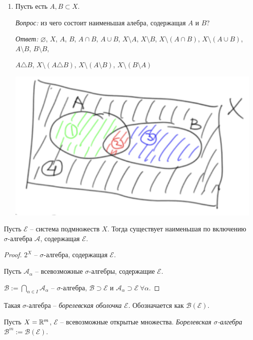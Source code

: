 \begin{example}
\begin{enumerate}
        \item Пусть есть $A, B\subset X$. 
        
        \textit{Вопрос:} из чего состоит наименьшая алебра, содержащая $A$ и $B$?
        
        \textit{Ответ:} $\varnothing$, $X$, $A$, $B$, $A\cap B$, $A \cup B$, $X \setminus A$, $X \setminus B$, $X \setminus (A\cap B)$, $X \setminus (A\cup B)$, $A\setminus B$, $B\setminus B$,
        
        $A\triangle B$, $X \setminus (A\triangle B)$, $X\setminus (A\setminus B)$, $X\setminus (B\setminus A)$

        \includegraphics[width=0.3\linewidth]{images/23-09-07-2.png}
    \end{enumerate}
\end{example}

\begin{theorem}
    Пусть $\mathcal{E}$ – система подмножеств $X$. Тогда существует наименьшая по включению $\sigma$-алгебра $\mathcal{A}$,
    содержащая $\mathcal{E}$.
\end{theorem}

\begin{proof}
    $2^X$ – $\sigma$-алгебра, содержащая $\mathcal{E}$.

    Пусть $\mathcal{A}_\alpha$ – всевозможные $\sigma$-алгебры, содержащие $\mathcal{E}$.

    $\mathcal{B} :=\bigcap\limits_{\alpha \in I}\mathcal{A}_\alpha$ – $\sigma$-алгебра, $\mathcal{B} \supset \mathcal{E}$ и $\mathcal{A}_\alpha \supset \mathcal{E}\ \forall \alpha$.
\end{proof}

\begin{definition}
    Такая $\sigma$-алгебра – \textit{борелевская оболочка $\mathcal{E}$}. Обозначается как $\mathcal{B}(\mathcal{E})$.
\end{definition}

\begin{definition}
    Пусть $X=\mathbb{R}^m$, $\mathcal{E}$ – всевозможные открытые множества. \textit{Борелевская $\sigma$-алгебра} $\mathcal{B}^m:=\mathcal{B}(\mathcal{E})$.
\end{definition}

